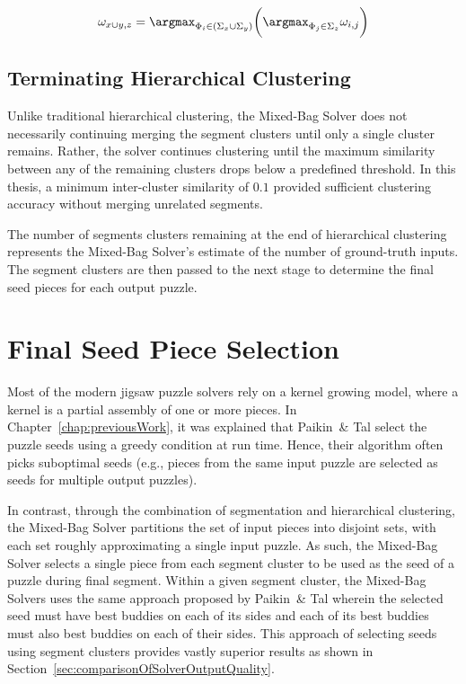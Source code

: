 \begin{equation} \label{eq:segmentClusterMerge}
	\omega_{x \cup y,z} = \argmax_{\Phi_i \in (\Sigma_x \cup \Sigma_y)} \bigg( \argmax_{\Phi_j \in \Sigma_z} \omega_{i,j} \bigg) 
\end{equation}

\subsection{Terminating Hierarchical Clustering}

Unlike traditional hierarchical clustering, the Mixed-Bag Solver does not necessarily continuing merging the segment clusters  until only a single cluster remains. Rather, the solver continues clustering until the maximum similarity between any of the remaining clusters drops below a predefined threshold.  In this thesis, a minimum inter-cluster similarity of $0.1$ provided sufficient clustering accuracy without merging unrelated segments.

The number of segments clusters remaining at the end of hierarchical clustering represents the Mixed-Bag Solver's estimate of the number of ground-truth inputs.  The segment clusters are then passed to the next stage to determine the final seed pieces for each output puzzle.

\section{Final Seed Piece Selection}\label{sec:finalSeedPiece}

Most of the modern jigsaw puzzle solvers \cite{pomeranz2011, sholomon2013, paikin2015} rely on a kernel growing model, where a kernel is a partial assembly of one or more pieces. In Chapter~\ref{chap:previousWork}, it was explained that Paikin~\& Tal select the puzzle seeds using a greedy condition at run time. Hence, their algorithm often picks suboptimal seeds (e.g., pieces from the same input puzzle are selected as seeds for multiple output puzzles). 

In contrast, through the combination of segmentation and hierarchical clustering, the Mixed-Bag Solver partitions the set of input pieces into disjoint sets, with each set roughly approximating a single input puzzle.  As such, the Mixed-Bag Solver selects a single piece from each segment cluster to be used as the seed of a puzzle during final segment.  Within a given segment cluster, the Mixed-Bag Solvers uses the same approach proposed by Paikin~\& Tal wherein the selected seed must have best buddies on each of its sides and each of its best buddies must also best buddies on each of their sides.  This approach of selecting seeds using segment clusters provides vastly superior results as shown in Section~\ref{sec:comparisonOfSolverOutputQuality}.

